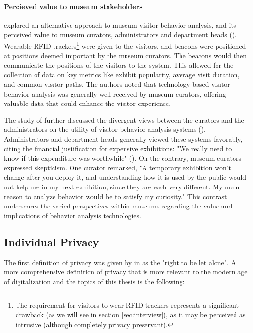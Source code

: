 \paragraph{Percieved value to museum stakeholders}
\citeauthor{la2017museumbehaviouranalysis} explored an alternative approach to museum visitor behavior analysis, and its perceived value to museum curators, administrators and department heads (\citeyear{la2017museumbehaviouranalysis}). Wearable RFID trackers\footnote{The requirement for visitors to wear RFID trackers represents a significant drawback (as we will see in section \ref{sec:interview}), as it may be perceived as intrusive (although completely privacy preservant).} were given to the visitors, and beacons were positioned at positions deemed important by the museum curators. The beacons would then communicate the positions of the visitors to the system. This allowed for the collection of data on key metrics like exhibit popularity, average visit duration, and common visitor paths. The authors noted that technology-based visitor behavior analysis was generally well-received by museum curators, offering valuable data that could enhance the visitor experience.

The study of \citeauthor{la2017museumbehaviouranalysis} further discussed the divergent views between the curators and the administrators on the utility of visitor behavior analysis systems (\citeyear{la2017museumbehaviouranalysis}). Administrators and department heads generally viewed these systems favorably, citing the financial justification for expensive exhibitions: "We really need to know if this expenditure was worthwhile" (\cite{la2017museumbehaviouranalysis}). On the contrary, museum curators expressed skepticism. One curator remarked, "A temporary exhibition won’t change after you deploy it, and understanding how it is used by the public would not help me in my next exhibition, since they are each very different. My main reason to analyze behavior would be to satisfy my curiosity." This contrast underscores the varied perspectives within museums regarding the value and implications of behavior analysis technologies.


\subsection{Individual Privacy}
\label{sec:lit-privacy}

The first definition of privacy was given by \citeauthor{br1890righttoprivacy} in \citeyear{br1890righttoprivacy} as the "right to be let alone". A more comprehensive definition of privacy that is more relevant to the modern age of digitalization and the topics of this thesis is the following:

